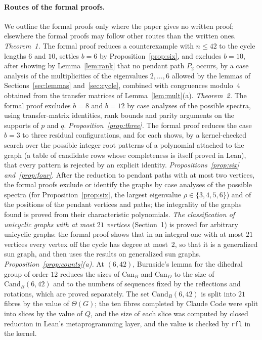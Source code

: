 \documentclass[11pt]{article}
\theoremstyle{definition}
\theoremstyle{remark}
\begin{document}
\paragraph{Routes of the formal proofs.}
We outline the formal proofs only where the paper gives no written proof;
elsewhere the formal proofs may follow other routes than the written ones.
\emph{Theorem~1.} The formal proof reduces a counterexample with $n\le42$ to the
cycle lengths $6$ and $10$, settles $b=6$ by Proposition~\ref{prop:six}, and
excludes $b=10$, after showing by Lemma~\ref{lem:rank} that no pendant path $P_2$ occurs, by a case analysis of the multiplicities of the eigenvalues
$2,\dots,6$ allowed by the lemmas of Sections~\ref{sec:lemmas}
and~\ref{sec:cycle}, combined with congruences modulo~$4$ obtained from the
transfer matrices of Lemma~\ref{lem:mult}(a).
\emph{Theorem~2.} The formal proof excludes $b=8$ and $b=12$ by case analyses
of the possible spectra, using transfer-matrix identities, rank bounds and
parity arguments on the supports of $p$ and $q$.
\emph{Proposition~\ref{prop:three}.} The formal proof reduces the case $b=3$ to
three residual configurations, and for each shows, by a kernel-checked search over
the possible integer root patterns of a polynomial attached to the graph (a table
of candidate rows whose completeness is itself proved in Lean), that every pattern
is rejected by an explicit identity.
\emph{Propositions~\ref{prop:six} and~\ref{prop:four}.} After the reduction to
pendant paths with at most two vertices, the formal proofs exclude or
identify the graphs by case analyses of the possible spectra (for
Proposition~\ref{prop:six}, the largest eigenvalue $\rho\in\{3,4,5,6\}$) and
of the positions of the pendant vertices and paths; the integrality of the
graphs found is proved from their characteristic polynomials.
\emph{The classification of unicyclic graphs with at most $21$ vertices}
(Section~1) is proved for arbitrary unicyclic graphs: the formal proof shows
that in an integral one with at most $21$ vertices every vertex off the cycle
has degree at most~$2$, so that it is a generalized sun graph, and then uses
the results on generalized sun graphs.
\emph{Proposition~\ref{prop:counts}(a).} At $(6,42)$, Burnside's lemma for the
dihedral group of order $12$ reduces the sizes of $\mathrm{Can}_B$ and
$\mathrm{Can}_D$ to the size of $\mathrm{Cand}_B(6,42)$ and to the numbers of
sequences fixed by the reflections and rotations, which are proved separately.
The set $\mathrm{Cand}_B(6,42)$ is split into $21$ fibres by the value of
$\Theta(G)$; the ten fibres completed by Claude Code were split into slices by the value of $Q$, and the size of each
slice was computed by closed reduction in Lean's metaprogramming layer, and
the value is checked by \texttt{rfl} in the kernel.
\end{document}
